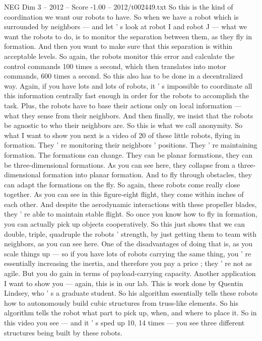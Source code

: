 \begin{textsample}{NEG Dim 3 – 2012 – Score -1.00 – 2012/t002449.txt}
So this is the kind of coordination we want our robots to have.
So when we have a robot which is surrounded by neighbors — and let ' s look at robot I and robot J — what we want the robots to do, is to monitor the separation between them, as they fly in formation.
And then you want to make sure that this separation is within acceptable levels.
So again, the robots monitor this error and calculate the control commands 100 times a second, which then translates into motor commands, 600 times a second.
So this also has to be done in a decentralized way.
Again, if you have lots and lots of robots, it ' s impossible to coordinate all this information centrally fast enough in order for the robots to accomplish the task.
Plus, the robots have to base their actions only on local information — what they sense from their neighbors.
And then finally, we insist that the robots be agnostic to who their neighbors are.
So this is what we call anonymity.
So what I want to show you next is a video of 20 of these little robots, flying in formation.
They ' re monitoring their neighbors ' positions.
They ' re maintaining formation.
The formations can change.
They can be planar formations, they can be three-dimensional formations.
As you can see here, they collapse from a three-dimensional formation into planar formation.
And to fly through obstacles, they can adapt the formations on the fly.
So again, these robots come really close together.
As you can see in this figure-eight flight, they come within inches of each other.
And despite the aerodynamic interactions with these propeller blades, they ' re able to maintain stable flight.
So once you know how to fly in formation, you can actually pick up objects cooperatively.
So this just shows that we can double, triple, quadruple the robots ' strength, by just getting them to team with neighbors, as you can see here.
One of the disadvantages of doing that is, as you scale things up — so if you have lots of robots carrying the same thing, you ' re essentially increasing the inertia, and therefore you pay a price ; they ' re not as agile.
But you do gain in terms of payload-carrying capacity.
Another application I want to show you — again, this is in our lab.
This is work done by Quentin Lindsey, who ' s a graduate student.
So his algorithm essentially tells these robots how to autonomously build cubic structures from truss-like elements.
So his algorithm tells the robot what part to pick up, when, and where to place it.
So in this video you see — and it ' s sped up 10, 14 times — you see three different structures being built by these robots.

\end{textsample}
